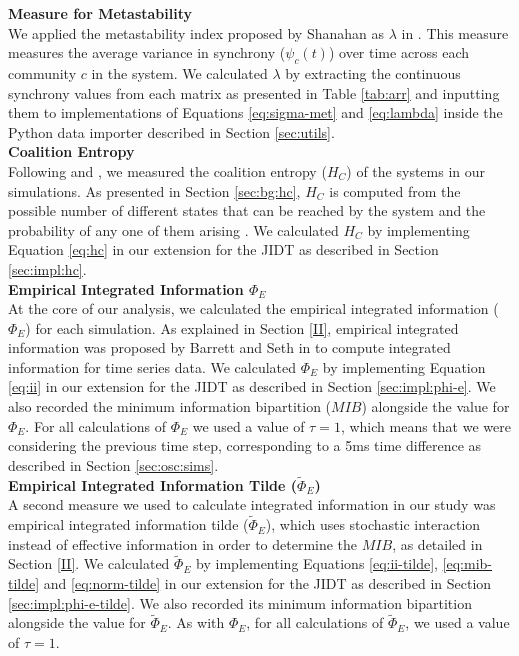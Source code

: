 \documentclass[a4paper,11pt]{article}
\begin{document}
\noindent \textbf{Measure for Metastability}\\
\noindent We applied the metastability index proposed by Shanahan as $\lambda$ in \cite{Shanahan2010}. This measure measures the average variance in synchrony ($\psi_c(t)$) over time across each community $c$ in the system. We calculated $\lambda$ by extracting the continuous synchrony values from each matrix as presented in Table \ref{tab:arr} and inputting them to implementations of Equations \ref{eq:sigma-met} and \ref{eq:lambda} inside the Python data importer described in Section \ref{sec:utils}.\\

\noindent \textbf{Coalition Entropy}\\
\noindent Following \cite{Shanahan2010} and \cite{Bhowmik2013}, we measured the coalition entropy ($H_C$) of the systems in our simulations. As presented in Section \ref{sec:bg:hc}, $H_C$ is computed from the possible number of different states that can be reached by the system and the probability of any one of them arising \cite{Bhowmik2013}. We calculated $H_{C}$ by implementing Equation \ref{eq:hc} in our extension for the JIDT as described in Section \ref{sec:impl:hc}.\\

\noindent \textbf{Empirical Integrated Information $\Phi_{E}$}\\
\noindent At the core of our analysis, we calculated the empirical integrated information ($\Phi_E$) for each simulation. As explained in Section \ref{II}, empirical integrated information was proposed by Barrett and Seth in \cite{Barrett2011} to compute integrated information for time series data. We calculated $\Phi_{E}$ by implementing Equation \ref{eq:ii} in our extension for the JIDT as described in Section \ref{sec:impl:phi-e}. We also recorded the minimum information bipartition ($MIB$) alongside the value for $\Phi_{E}$. For all calculations of $\Phi_E$ we used a value of $\tau = 1$, which means that we were considering the previous time step, corresponding to a 5ms time difference as described in Section \ref{sec:osc:sims}.\\

\noindent \textbf{Empirical Integrated Information Tilde ($\widetilde{\Phi}_{E}$)}\\
\noindent A second measure we used to calculate integrated information in our study was empirical integrated information tilde ($\widetilde{\Phi}_{E}$), which uses stochastic interaction instead of effective information in order to determine the $MIB$, as detailed in Section \ref{II}. We calculated $\widetilde{\Phi}_{E}$ by implementing Equations \ref{eq:ii-tilde},  \ref{eq:mib-tilde} and \ref{eq:norm-tilde} in our extension for the JIDT as described in Section \ref{sec:impl:phi-e-tilde}. We also recorded its minimum information bipartition alongside the value for $\widetilde{\Phi}_{E}$. As with $\Phi_E$, for all calculations of $\widetilde{\Phi}_{E}$, we used a value of $\tau = 1$.\\
\end{document}
